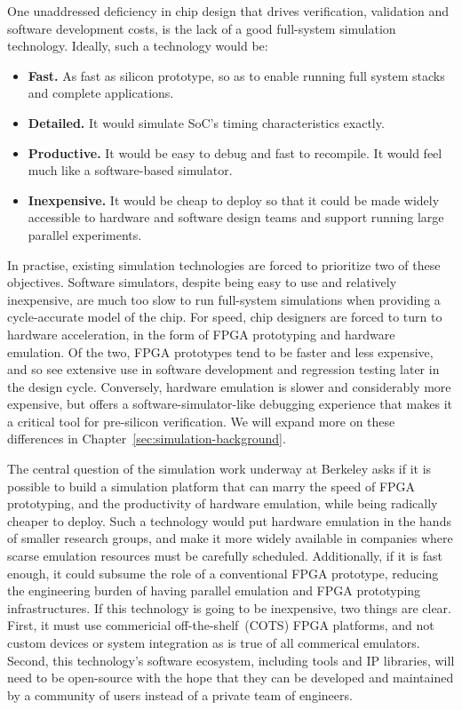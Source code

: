 One unaddressed deficiency in chip design that drives verification, validation and software development
costs, is the lack of a good full-system simulation technology. Ideally, such
a technology would be:
\begin{itemize}
    \item \textbf{Fast.} As fast as silicon prototype, so as to enable running full system
    stacks and complete applications.
\item \textbf{Detailed.} It would simulate SoC's timing characteristics exactly.
\item \textbf{Productive.} It would be easy to debug and fast to recompile.  It would feel much like a software-based simulator.
\item \textbf{Inexpensive.} It would be cheap to deploy so that it could be made widely accessible
        to hardware and software design teams and support running large parallel experiments.
\end{itemize}

In practise, existing simulation technologies are forced to prioritize two of
these objectives. Software simulators, despite being easy to use and relatively
inexpensive, are much too slow to run full-system simulations when providing a
cycle-accurate model of the chip. For speed, chip designers are forced to turn
to hardware acceleration, in the form of FPGA prototyping and hardware
emulation.  Of the two, FPGA prototypes tend to be faster and less expensive,
and so see extensive use in software development and regression testing later
in the design cycle.  Conversely, hardware emulation is slower and considerably
more expensive, but offers a software-simulator-like debugging experience that
makes it a critical tool for pre-silicon verification. We will expand more on these
differences in Chapter~\ref{sec:simulation-background}.

The central question of the simulation work underway at Berkeley asks if it is
possible to build a simulation platform that can marry the speed of FPGA
prototyping, and the productivity of hardware emulation, while being radically
cheaper to deploy. Such a technology would put hardware emulation in the hands
of smaller research groups, and make it more widely available in companies
where scarse emulation resources must be carefully scheduled. Additionally, if
it is fast enough, it could subsume the role of a conventional FPGA prototype,
reducing the engineering burden of having parallel emulation and FPGA
prototyping infrastructures. If this technology is going to be inexpensive, two
things are clear.  First, it must use commericial off-the-shelf~(COTS) FPGA
platforms, and not custom devices or system integration as is true of all
commerical emulators. Second, this technology's software ecosystem, including
tools and IP libraries, will need to be open-source with the hope that they can
be developed and maintained by a community of users instead of a private team
of engineers.


